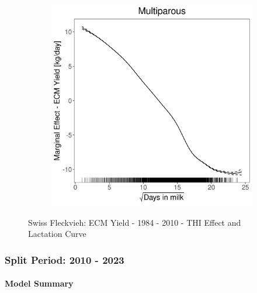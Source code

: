 \begin{figure}[H]
\begin{subfigure}[b]{0.45\textwidth}
    \end{subfigure}
    \hspace{0.05\textwidth} %
    \begin{subfigure}[b]{0.45\textwidth}
        \centering
        \includegraphics[width=\textwidth]{thesis/figures/models/ecm/before2010/sf_ecm_before2010/sf_ecm_before2010_marginal_dim_milk_multi.png}
    \end{subfigure}
    \caption[]{Swiss Fleckvieh: ECM Yield - 1984 - 2010 - THI Effect and Lactation Curve}
    \label{fig:main}
\end{figure}

\subsubsection{Split Period: 2010 - 2023}\label{model:sf_ecm_after}

\paragraph{Model Summary} \quad \\

